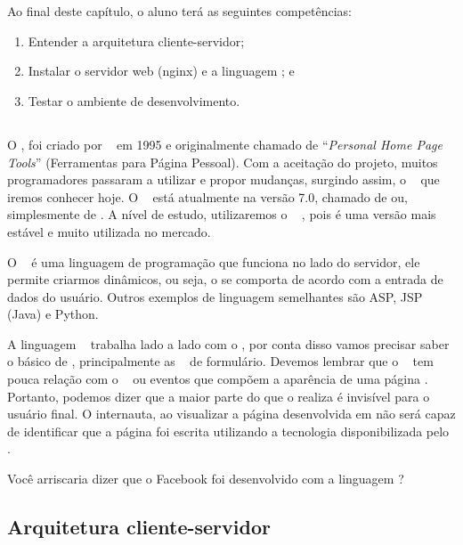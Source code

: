 \chapter{\php}

Ao final deste capítulo, o aluno terá as seguintes competências:
\begin{enumerate}
	\item Entender a arquitetura cliente-servidor;
	\item Instalar o servidor web (nginx) e a linguagem \php; e
	\item Testar o ambiente de desenvolvimento. 
\end{enumerate}

\section{\phpcompleto}

O \phpcompleto, foi criado por \phpcriador~ em 1995 e originalmente chamado de 
“\textit{Personal Home Page Tools}” (Ferramentas para Página Pessoal). Com a 
aceitação do projeto, muitos programadores passaram a utilizar e propor mudanças,
surgindo assim, o \php~ que iremos conhecer hoje. O \php~ está atualmente na
versão 7.0, chamado de  ou, simplesmente de \php. A nível de estudo, 
utilizaremos o \php~ \phpversao, pois é uma versão mais estável e muito 
utilizada no mercado.

O \php~ é uma linguagem de programação que funciona no lado do servidor, 
ele permite criarmos \sites dinâmicos, ou seja, o \site se comporta de acordo 
com a entrada de dados do usuário. Outros exemplos de linguagem semelhantes são 
ASP, JSP (Java) e Python.

A linguagem \php~ trabalha lado a lado com o \htmlcompleto, por conta disso vamos
precisar saber o básico de \html, principalmente as \tags~ de formulário. Devemos
lembrar que o \php~ tem pouca relação com o \layout~ ou eventos que compõem a 
aparência de uma página \web. Portanto, podemos dizer que a maior parte do que o
\php realiza é invisível para o usuário final. O internauta, ao visualizar a 
página desenvolvida em \php não será capaz de identificar que a página foi 
escrita utilizando a tecnologia disponibilizada pelo \php. 

Você arriscaria dizer que o Facebook foi desenvolvido com a linguagem \php?

\section{Arquitetura cliente-servidor}
\label{arquitetura-cliente-servidor}

